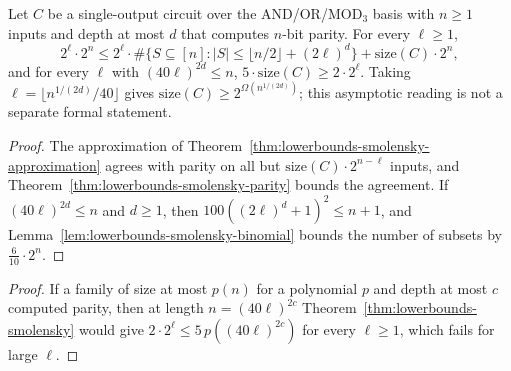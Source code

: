\begin{theorem}
  \label{thm:lowerbounds-smolensky}
  \leanok
  Let $C$ be a single-output circuit over the AND/OR/$\mathrm{MOD}_3$ basis with
  $n \ge 1$ inputs and depth at most $d$ that computes $n$-bit parity. For
  every $\ell \ge 1$,
  \[ 2^\ell \cdot 2^n \le
     2^\ell \cdot \#\{S \subseteq [n] : |S| \le \lfloor n/2 \rfloor + (2\ell)^d\}
     + \mathrm{size}(C) \cdot 2^n , \]
  and for every $\ell$ with $(40 \ell)^{2d} \le n$,
  $5 \cdot \mathrm{size}(C) \ge 2 \cdot 2^\ell$. Taking
  $\ell = \lfloor n^{1/(2d)}/40 \rfloor$ gives
  $\mathrm{size}(C) \ge 2^{\Omega(n^{1/(2d)})}$; this asymptotic reading is
  not a separate formal statement.
\end{theorem}
\begin{proof}
  \leanok
  The approximation of Theorem~\ref{thm:lowerbounds-smolensky-approximation}
  agrees with parity on all but $\mathrm{size}(C) \cdot 2^{n-\ell}$ inputs, and
  Theorem~\ref{thm:lowerbounds-smolensky-parity} bounds the agreement. If
  $(40\ell)^{2d} \le n$ and $d \ge 1$, then $100((2\ell)^d + 1)^2 \le n + 1$,
  and Lemma~\ref{lem:lowerbounds-smolensky-binomial} bounds the number of
  subsets by $\tfrac{6}{10} \cdot 2^n$.
\end{proof}

\begin{proof}
  \leanok
  If a family of size at most $p(n)$ for a polynomial $p$ and depth at most $c$
  computed parity, then at length $n = (40\ell)^{2c}$
  Theorem~\ref{thm:lowerbounds-smolensky} would give
  $2 ^\ell {}\, p((40\ell)^{2c})$ for every $\ell {}$, which fails
  for large $\ell$.
\end{proof}

